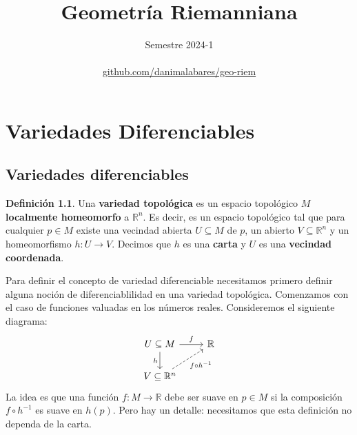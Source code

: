 \documentclass[spanish]{book}
\title{Geometría Riemanniana}
\author{Semestre 2024-1\\ \\ \href{https://github.com/danimalabares/geo-riem/blob/main/geo-riem.pdf}{github.com/danimalabares/geo-riem}}
\renewcommand{\contentsname}{Índice}
\theoremstyle{definition}
\newtheorem*{defn}{Definición}
\newcommand{\R}{\mathbb{R}}
\begin{document}
	\maketitle
	\addcontentsline{toc}{part}{\contentsname}
	\tableofcontents
	
	\chapter{Variedades Diferenciables}
	\section{Variedades diferenciables}
	\begin{defn}
		Una \textbf{variedad topológica} es un espacio topológico $M$ \textbf{localmente homeomorfo} a $\R^n$. Es decir, es un espacio topológico tal que para cualquier $p\in M$ existe una vecindad abierta $U\subseteq M$ de $p$, un abierto $V\subseteq\R^n$ y un  homeomorfismo $h:U\to V$. Decimos que $h$ es una \textbf{carta} y $U$ es una \textbf{vecindad coordenada}.
	\end{defn}
	Para definir el concepto de variedad diferenciable necesitamos primero definir alguna noción de diferenciablilidad en una variedad topológica. Comenzamos con el caso de funciones valuadas en los números reales. Consideremos el siguiente diagrama:
	\[\begin{tikzcd}
		U\subseteq M\arrow{r}{f} \arrow{d}[swap]{h} & \mathbb{R} \\
		V \subseteq \mathbb{R}^n \arrow[swap,dashed]{ur}{f \circ h^{-1}} 
	\end{tikzcd}\]
	La idea es que una función $f:M\to\R$ debe ser suave en $p\in M$ si la composición $f\circ h^{-1}$ es suave en $h(p)$. Pero hay un detalle: necesitamos que esta definición no dependa de la carta.
	
\end{document}
